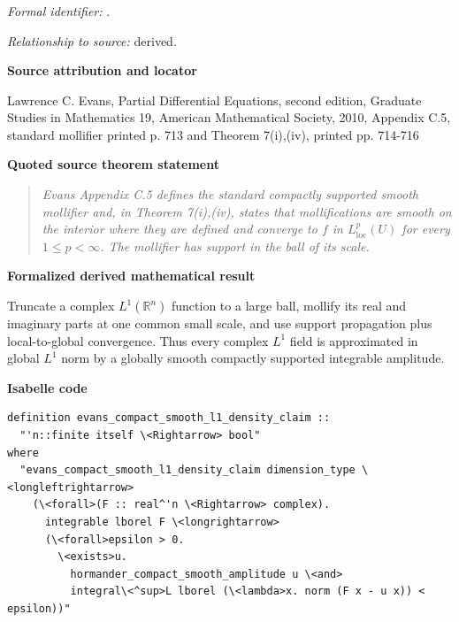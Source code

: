 \documentclass[10pt,oneside]{article}
\newenvironment{sourcequote}{\begin{quote}\itshape}{\end{quote}}
\newcommand{\reviewlabel}[1]{\par\smallskip\noindent\textsf{\bfseries #1}\par\smallskip}
\begin{document}
\subsubsection{\texttt{}}
\noindent\textit{Formal identifier:} \texttt{}.\par
\noindent\textit{Relationship to source:} derived.

\reviewlabel{Source attribution and locator}
Lawrence C. Evans, Partial Differential Equations, second edition, Graduate Studies in Mathematics 19, American Mathematical Society, 2010, Appendix C.5, standard mollifier printed p. 713 and Theorem 7(i),(iv), printed pp. 714-716

\reviewlabel{Quoted source theorem statement}
\begin{sourcequote}
Evans Appendix C.5 defines the standard compactly supported smooth mollifier and, in Theorem 7(i),(iv), states that mollifications are smooth on the interior where they are defined and converge to $f$ in $L^p_{\mathrm{loc}}(U)$ for every $1\leq p<\infty$. The mollifier has support in the ball of its scale.
\end{sourcequote}

\reviewlabel{Formalized derived mathematical result}
Truncate a complex $L^1(\mathbb R^n)$ function to a large ball, mollify its real and imaginary parts at one common small scale, and use support propagation plus local-to-global convergence. Thus every complex $L^1$ field is approximated in global $L^1$ norm by a globally smooth compactly supported integrable amplitude.

\reviewlabel{Isabelle code}
\begin{lstlisting}
definition evans_compact_smooth_l1_density_claim ::
  "'n::finite itself \<Rightarrow> bool"
where
  "evans_compact_smooth_l1_density_claim dimension_type \<longleftrightarrow>
    (\<forall>(F :: real^'n \<Rightarrow> complex).
      integrable lborel F \<longrightarrow>
      (\<forall>epsilon > 0.
        \<exists>u.
          hormander_compact_smooth_amplitude u \<and>
          integral\<^sup>L lborel (\<lambda>x. norm (F x - u x)) < epsilon))"
\end{lstlisting}
\end{document}
